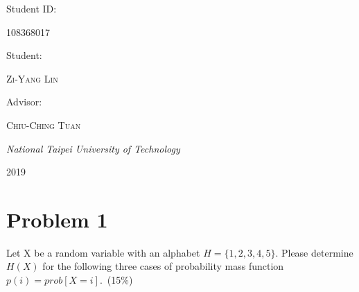 \documentclass[a4paper, 11pt, oneside]{article} %
\newcommand{\plogo}{\fbox{$\mathcal{PL}$}} %
\begin{document}
\begin{titlepage}
	
	Student ID:

	\vspace{0.5\baselineskip}

	{\scshape 108368017}

	\vspace{0.5\baselineskip}

	Student: 
	
	\vspace{0.5\baselineskip} %

	{\scshape\Large Zi-Yang Lin } %

	\vspace{0.5\baselineskip} %


	Advisor:

	\vspace{0.5\baselineskip} %
	
	{\scshape\Large Chiu-Ching Tuan} %
	
	\vspace{0.5\baselineskip} %
	
	\textit{National Taipei University of Technology} %
	
	\vfill %
	
	
	
	\vspace{0.3\baselineskip} %
	
	2019 %
	

\end{titlepage}

\clearpage

\section*{Problem 1}
Let X be a random variable with an alphabet $H=\{1, 2, 3, 4, 5\}$. Please determine 
$H(X)$ for the following three cases of probability mass function $p(i)=prob[X=i]$.~(15\%)
\end{document}
